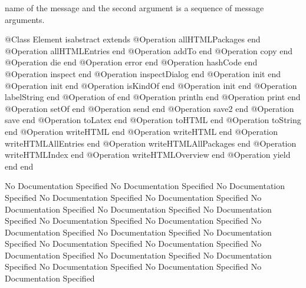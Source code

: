       name of the message and the second argument is a sequence of message arguments.
\begin{Interface}
@Class Element isabstract extends 
  @Operation allHTMLPackages end
  @Operation allHTMLEntries end
  @Operation addTo end
  @Operation copy end
  @Operation die end
  @Operation error end
  @Operation hashCode end
  @Operation inspect end
  @Operation inspectDialog end
  @Operation init end
  @Operation init end
  @Operation isKindOf end
  @Operation init end
  @Operation labelString end
  @Operation of end
  @Operation println end
  @Operation print end
  @Operation setOf end
  @Operation send end
  @Operation save2 end
  @Operation save end
  @Operation toLatex end
  @Operation toHTML end
  @Operation toString end
  @Operation writeHTML end
  @Operation writeHTML end
  @Operation writeHTMLAllEntries end
  @Operation writeHTMLAllPackages end
  @Operation writeHTMLIndex end
  @Operation writeHTMLOverview end
  @Operation yield end
end
\end{Interface}
No Documentation Specified
No Documentation Specified
No Documentation Specified
No Documentation Specified
No Documentation Specified
No Documentation Specified
No Documentation Specified
No Documentation Specified
No Documentation Specified
No Documentation Specified
No Documentation Specified
No Documentation Specified
No Documentation Specified
No Documentation Specified
No Documentation Specified
No Documentation Specified
No Documentation Specified
No Documentation Specified
No Documentation Specified
No Documentation Specified
No Documentation Specified
